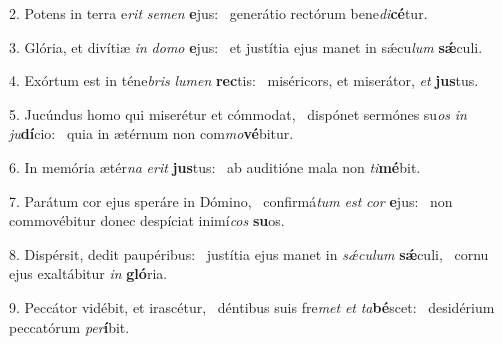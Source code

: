 2. Potens in terra e\textit{rit} \textit{se}\textit{men} \textbf{e}jus: \ast\  generátio rectórum bene\textit{di}\textbf{cé}tur.\

3. Glória, et divítiæ \textit{in} \textit{do}\textit{mo} \textbf{e}jus: \ast\  et justítia ejus manet in sǽcu\textit{lum} \textbf{sǽ}culi.\

4. Exórtum est in téne\textit{bris} \textit{lu}\textit{men} \textbf{rec}tis: \ast\  miséricors, et miserátor, \textit{et} \textbf{jus}tus.\

5. Jucúndus homo qui miserétur et cómmodat, \dag\  dispónet sermónes su\textit{os} \textit{in} \textit{ju}\textbf{dí}cio: \ast\  quia in ætérnum non com\textit{mo}\textbf{vé}bitur.\

6. In memória ætér\textit{na} \textit{e}\textit{rit} \textbf{jus}tus: \ast\  ab auditióne mala non \textit{ti}\textbf{mé}bit.\

7. Parátum cor ejus speráre in Dómino, \dag\  confirmá\textit{tum} \textit{est} \textit{cor} \textbf{e}jus: \ast\  non commovébitur donec despíciat inimí\textit{cos} \textbf{su}os.\

8. Dispérsit, dedit paupéribus: \dag\  justítia ejus manet in \textit{sǽ}\textit{cu}\textit{lum} \textbf{sǽ}culi, \ast\  cornu ejus exaltábitur \textit{in} \textbf{gló}ria.\

9. Peccátor vidébit, et irascétur, \dag\  déntibus suis fre\textit{met} \textit{et} \textit{ta}\textbf{bé}scet: \ast\  desidérium peccatórum \textit{per}\textbf{í}bit.\

